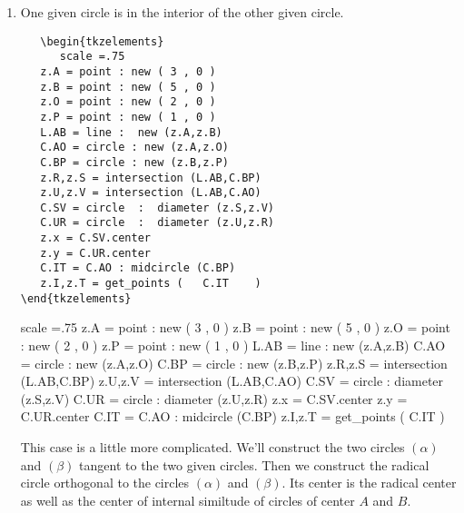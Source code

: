 \begin{enumerate}[label=(\roman*)]
\vfill

\item  One given circle is in the interior of the other given circle.

\begin{minipage}{.6\textwidth}
\begin{verbatim}
   \begin{tkzelements}
      scale =.75  
   z.A = point : new ( 3 , 0 ) 
   z.B = point : new ( 5 , 0 ) 
   z.O = point : new ( 2 , 0 ) 
   z.P = point : new ( 1 , 0 ) 
   L.AB = line :  new (z.A,z.B)
   C.AO = circle : new (z.A,z.O)
   C.BP = circle : new (z.B,z.P)
   z.R,z.S = intersection (L.AB,C.BP)
   z.U,z.V = intersection (L.AB,C.AO) 
   C.SV = circle  :  diameter (z.S,z.V)
   C.UR = circle  :  diameter (z.U,z.R)
   z.x = C.SV.center
   z.y = C.UR.center
   C.IT = C.AO : midcircle (C.BP)
   z.I,z.T = get_points (   C.IT    ) 
\end{tkzelements}
\end{verbatim}
\end{minipage}
\begin{minipage}{.6\textwidth}
   \begin{tkzelements}
         scale =.75  
      z.A = point : new ( 3 , 0 ) 
      z.B = point : new ( 5 , 0 ) 
      z.O = point : new ( 2 , 0 ) 
      z.P = point : new ( 1 , 0 ) 
      L.AB = line :  new (z.A,z.B)
      C.AO = circle : new (z.A,z.O)
      C.BP = circle : new (z.B,z.P)
      z.R,z.S = intersection (L.AB,C.BP)
      z.U,z.V = intersection (L.AB,C.AO) 
      C.SV = circle  :  diameter (z.S,z.V)
      C.UR = circle  :  diameter (z.U,z.R)
      z.x = C.SV.center
      z.y = C.UR.center
      C.IT = C.AO : midcircle (C.BP)
      z.I,z.T = get_points (   C.IT    ) 
   \end{tkzelements}
   \end{minipage}

This case is a little more complicated. We'll construct the two circles $(\alpha)$ and $(\beta)$ tangent to the two given circles. Then we construct the radical circle orthogonal to the circles $(\alpha)$ and $(\beta)$. Its center is the radical center as well as the center of internal similtude of circles of center $A$ and $B$.


\end{enumerate}
